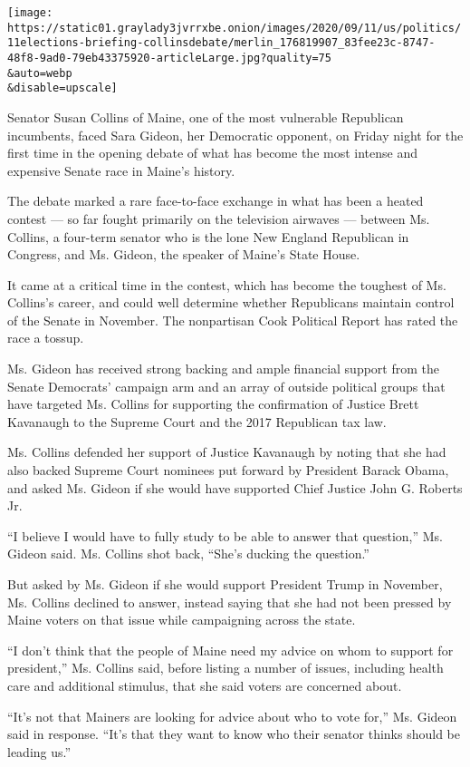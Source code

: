 \texttt{[image: https://static01.graylady3jvrrxbe.onion/images/2020/09/11/us/politics/11elections-briefing-collinsdebate/merlin\_176819907\_83fee23c-8747-48f8-9ad0-79eb43375920-articleLarge.jpg?quality=75\\\&auto=webp\\\&disable=upscale]}

Senator Susan Collins of Maine, one of the most vulnerable Republican
incumbents, faced Sara Gideon, her Democratic opponent, on Friday night
for the first time in the opening debate of what has become the most
intense and expensive Senate race in Maine's history.

The debate marked a rare face-to-face exchange in what has been a heated
contest --- so far fought primarily on the television airwaves ---
between Ms. Collins, a four-term senator who is the lone New England
Republican in Congress, and Ms. Gideon, the speaker of Maine's State
House.

It came at a critical time in the contest, which has become the toughest
of Ms. Collins's career, and could well determine whether Republicans
maintain control of the Senate in November. The nonpartisan Cook
Political Report has rated the race a tossup.

Ms. Gideon has received strong backing and ample financial support from
the Senate Democrats' campaign arm and an array of outside political
groups that have targeted Ms. Collins for supporting the confirmation of
Justice Brett Kavanaugh to the Supreme Court and the 2017 Republican tax
law.

Ms. Collins defended her support of Justice Kavanaugh by noting that she
had also backed Supreme Court nominees put forward by President Barack
Obama, and asked Ms. Gideon if she would have supported Chief Justice
John G. Roberts Jr.

``I believe I would have to fully study to be able to answer that
question,'' Ms. Gideon said. Ms. Collins shot back, ``She's ducking the
question.''

But asked by Ms. Gideon if she would support President Trump in
November, Ms. Collins declined to answer, instead saying that she had
not been pressed by Maine voters on that issue while campaigning across
the state.

``I don't think that the people of Maine need my advice on whom to
support for president,'' Ms. Collins said, before listing a number of
issues, including health care and additional stimulus, that she said
voters are concerned about.

``It's not that Mainers are looking for advice about who to vote for,''
Ms. Gideon said in response. ``It's that they want to know who their
senator thinks should be leading us.''

